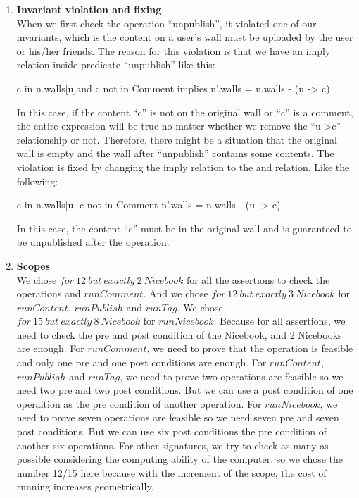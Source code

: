 \documentclass[titlepage]{article}
\begin{document}
\begin{enumerate}[\bf\large 1.]
    \item {\bf\large Invariant violation and fixing}\\[1ex]
    When we first check the operation “unpublish”, it violated one of our invariants, which is the content on a user’s wall must be uploaded by the user or his/her friends. The reason for this violation is that we have an imply relation inside predicate “unpublish” like this:
    \begin{alloy}
c in n.walls[u]and c not in Comment implies n'.walls = n.walls - (u -> c)
    \end{alloy}
    In this case, if the content “c” is not on the original wall or “c” is a comment, the entire expression will be true no matter whether we remove the “u->c” relationship or not. Therefore, there might be a situation that the original wall is empty and the wall after “unpublish” contains some contents. The violation is fixed by changing the imply relation to the and relation. Like the following:
    \begin{alloy}
c in n.walls[u]
c not in Comment
n'.walls = n.walls - (u -> c)        
    \end{alloy}
    In this case, the content “c” must be in the original wall and is guaranteed to be unpublished after the operation.
    \item {\bf\large Scopes}\\[1ex]
    We chose $for~12~but~exactly~2~Nicebook$ for all the assertions to check the operations and $runComment$. 
    And we chose $for~12~but~exactly~3~Nicebook$ for $runContent$, $runPublish$ and $runTag$.
    We chose \\$for~15~but~exactly~8~Nicebook$ for $runNicebook$.
    Because for all assertions, we need to check the pre and post condition of the Nicebook, and 2 Nicebooks are enough.
    For $runComment$, we need to prove that the operation is feasible and only one pre and one post conditions are enough.
    For $runContent$, $runPublish$ and $runTag$, we need to prove two operations are feasible so we need two pre and two post conditions. But we can use a post condition of one operaition as the pre condition of another operation.
    For $runNicebook$, we need to prove seven operations are feasible so we need seven pre and seven post conditions. But we can use six post conditions the pre condition of another six operations.
    For other signatures, we try to check as many as possible considering the computing ability of the computer, so we chose the number 12/15 here because with the increment of the scope, the cost of running increases geometrically.\\{}
\end{enumerate}
\end{document}
